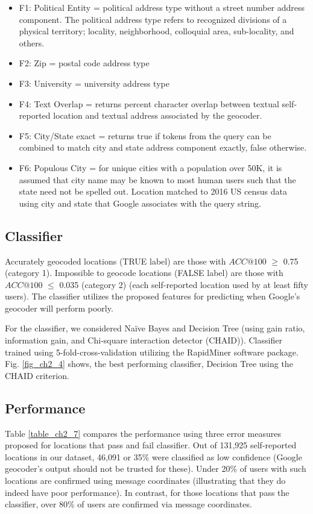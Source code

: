 \begin{itemize}
\item F1: Political Entity = political address type without a street number address component. The political address type refers to recognized divisions of a physical territory; locality, neighborhood, colloquial area, sub-locality, and others.
\item F2: Zip = postal code address type
\item F3: University = university address type
\item F4: Text Overlap = returns percent character overlap between textual self-reported location and textual address associated by the geocoder.
\item F5: City/State exact = returns true if tokens from the query can be combined to match city and state address component exactly, false otherwise. 
\item F6: Populous City = for unique cities with a population over 50K, it is assumed that city name may be known to most human users such that the state need not be spelled out. Location matched to 2016 US census data using city and state that Google associates with the query string.
\end{itemize}

\subsection{Classifier}

Accurately geocoded locations (TRUE label) are those with $ACC@100$ $\geq$ 0.75 (category 1). Impossible to geocode locations (FALSE label) are those with $ACC@100$ $\leq$ 0.035 (category 2) (each self-reported location used by at least fifty users). The classifier utilizes the proposed features for predicting when Google's geocoder will perform poorly. 

For the classifier, we considered Naïve Bayes and Decision Tree (using gain ratio, information gain, and Chi-square interaction detector (CHAID)). Classifier trained using 5-fold-cross-validation utilizing the RapidMiner software package. Fig. \ref{fig_ch2_4} shows, the best performing classifier, Decision Tree using the CHAID criterion. 

\subsection{Performance}

Table \ref{table_ch2_7} compares the performance using three error measures proposed for locations that pass and fail classifier. Out of 131,925 self-reported locations in our dataset, 46,091 or 35\% were classified as low confidence (Google geocoder's output should not be trusted for these). Under 20\% of users with such locations are confirmed using message coordinates (illustrating that they do indeed have poor performance). In contrast, for those locations that pass the classifier, over 80\% of users are confirmed via message coordinates.   


